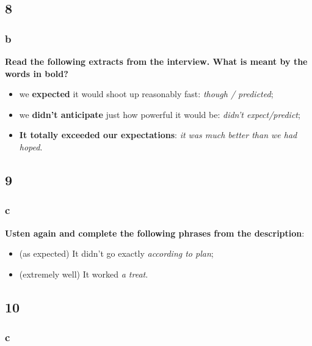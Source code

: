\subsection{8}

\subsubsection{b}

\textbf{Read the following extracts from the interview. What is meant by the words in bold?}

\begin{itemize}

\item we \textbf{expected} it would shoot up reasonably fast: \textit{though / predicted};
\item we \textbf{didn't anticipate} just how powerful it would be: \textit{didn't expect/predict};
\item \textbf{It totally exceeded our expectations}: \textit{it was much better than we had hoped}.

\end{itemize}

\subsection{9}

\subsubsection{c}

\textbf{Usten again and complete the following phrases from the description}:

\begin{itemize}

\item (as expected) It didn't go exactly \textit{according to plan};
\item (extremely well) It worked \textit{a treat}.

\end{itemize}

\subsection{10}

\subsubsection{c}

